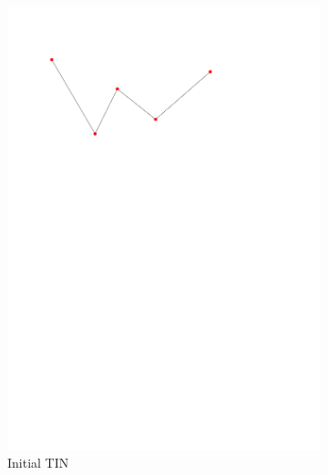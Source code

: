 \begin{figure}
  \centering
  \begin{subfigure}[b]{0.35\linewidth}
    \centering
    \includegraphics[width=\textwidth,page=1]{figs/1Ddensop.pdf}
    \caption{Initial TIN}\label{fig:1Ddensop:a}
  \end{subfigure}
  \quad
  \begin{subfigure}[b]{0.35\linewidth}
    \centering

\end{subfigure}
\end{figure}
